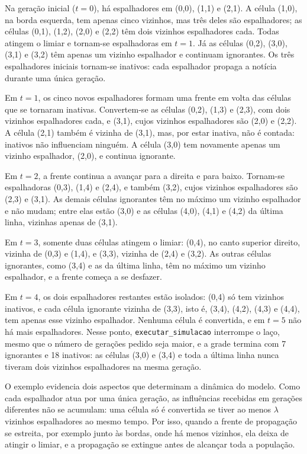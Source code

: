 Na geração inicial ($t=0$), há espalhadores em (0,0), (1,1) e (2,1). A célula (1,0), na borda esquerda, tem apenas cinco vizinhos, mas três deles são espalhadores; as células (0,1), (1,2), (2,0) e (2,2) têm dois vizinhos espalhadores cada. Todas atingem o limiar e tornam-se espalhadoras em $t=1$. Já as células (0,2), (3,0), (3,1) e (3,2) têm apenas um vizinho espalhador e continuam ignorantes. Os três espalhadores iniciais tornam-se inativos: cada espalhador propaga a notícia durante uma única geração.

Em $t=1$, os cinco novos espalhadores formam uma frente em volta das células que se tornaram inativas. Convertem-se as células (0,2), (1,3) e (2,3), com dois vizinhos espalhadores cada, e (3,1), cujos vizinhos espalhadores são (2,0) e (2,2). A célula (2,1) também é vizinha de (3,1), mas, por estar inativa, não é contada: inativos não influenciam ninguém. A célula (3,0) tem novamente apenas um vizinho espalhador, (2,0), e continua ignorante.

Em $t=2$, a frente continua a avançar para a direita e para baixo. Tornam-se espalhadoras (0,3), (1,4) e (2,4), e também (3,2), cujos vizinhos espalhadores são (2,3) e (3,1). As demais células ignorantes têm no máximo um vizinho espalhador e não mudam; entre elas estão (3,0) e as células (4,0), (4,1) e (4,2) da última linha, vizinhas apenas de (3,1).

Em $t=3$, somente duas células atingem o limiar: (0,4), no canto superior direito, vizinha de (0,3) e (1,4), e (3,3), vizinha de (2,4) e (3,2). As outras células ignorantes, como (3,4) e as da última linha, têm no máximo um vizinho espalhador, e a frente começa a se desfazer.

Em $t=4$, os dois espalhadores restantes estão isolados: (0,4) só tem vizinhos inativos, e cada célula ignorante vizinha de (3,3), isto é, (3,4), (4,2), (4,3) e (4,4), tem apenas esse vizinho espalhador. Nenhuma célula é convertida, e em $t=5$ não há mais espalhadores. Nesse ponto, \texttt{executar\_simulacao} interrompe o laço, mesmo que o número de gerações pedido seja maior, e a grade termina com 7 ignorantes e 18 inativos: as células (3,0) e (3,4) e toda a última linha nunca tiveram dois vizinhos espalhadores na mesma geração.

O exemplo evidencia dois aspectos que determinam a dinâmica do modelo. Como cada espalhador atua por uma única geração, as influências recebidas em gerações diferentes não se acumulam: uma célula só é convertida se tiver ao menos $\lambda$ vizinhos espalhadores ao mesmo tempo. Por isso, quando a frente de propagação se estreita, por exemplo junto às bordas, onde há menos vizinhos, ela deixa de atingir o limiar, e a propagação se extingue antes de alcançar toda a população.

